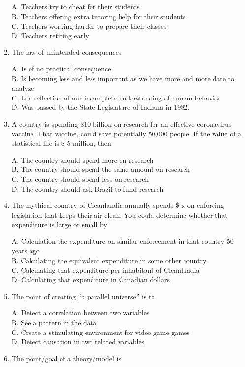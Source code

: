 \documentclass[
]{book}
\begin{document}
\begin{enumerate}
  A. Teachers try to cheat for their students\\
  B. Teachers offering extra tutoring help for their students\\
  C. Teachers working harder to prepare their classes\\
  D. Teachers retiring early
\item
  The law of unintended consequences

  A. Is of no practical consequence\\
  B. Is becoming less and less important as we have more and more date to analyze\\
  C. Is a reflection of our incomplete understanding of human behavior\\
  D. Was passed by the State Legislature of Indiana in 1982.
\item
  A country is spending \(\$10\) billion on research for an effective coronavirus vaccine. That vaccine, could save potentially 50,000 people. If the value of a statistical life is \$ 5 million, then

  A. The country should spend more on research\\
  B. The country should spend the same amount on research\\
  C. The country should spend less on research\\
  D. The country should ask Brazil to fund research
\item
  The mythical country of Cleanlandia annually spends \$ x on enforcing legislation that keeps their air clean. You could determine whether that expenditure is large or small by

  A. Calculation the expenditure on similar enforcement in that country 50 years ago\\
  B. Calculating the equivalent expenditure in some other country\\
  C. Calculating that expenditure per inhabitant of Cleanlandia\\
  D. Calculating that expenditure in Canadian dollars
\item
  The point of creating ``a parallel universe'' is to

  A. Detect a correlation between two variables\\
  B. See a pattern in the data\\
  C. Create a stimulating environment for video game games\\
  D. Detect causation in two related variables
\item
  The point/goal of a theory/model is


\end{enumerate}
\end{document}
